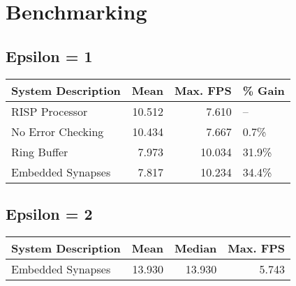 \documentclass[conference]{IEEEtran}{}
\begin{document}
\section{Benchmarking}
\label{sec:org63689c5}
\subsection{Epsilon = 1}
\label{sec:orgf3d96ec}
\begin{center}
\begin{tabular}{l|r|r|l}
System Description & Mean & Max. FPS & \% Gain\\
\hline
RISP Processor & 10.512 & 7.610 & --\\
No Error Checking & 10.434 & 7.667 & 0.7\%\\
Ring Buffer & 7.973 & 10.034 & 31.9\%\\
Embedded Synapses & 7.817 & 10.234 & 34.4\%\\
\end{tabular}
\end{center}
\subsection{Epsilon = 2}
\label{sec:orgc6e7fe0}
\begin{center}
\begin{tabular}{l|r|r|r}
System Description & Mean & Median & Max. FPS\\
\hline
Embedded Synapses & 13.930 & 13.930 & 5.743\\
\end{tabular}
\end{center}
\end{document}
